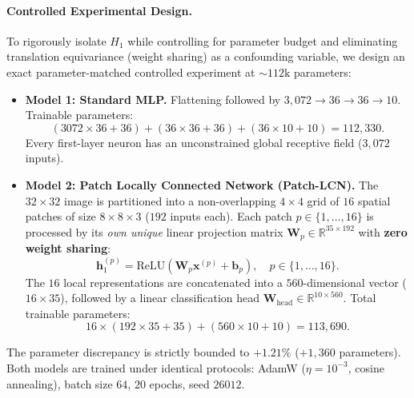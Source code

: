 \paragraph{Controlled Experimental Design.}
To rigorously isolate $H_1$ while controlling for parameter budget and eliminating translation equivariance (weight sharing) as a confounding variable, we design an exact parameter-matched controlled experiment at $\sim 112\text{k}$ parameters:
\begin{itemize}
    \item \textbf{Model 1: Standard MLP.} Flattening followed by $3{,}072 \to 36 \to 36 \to 10$. Trainable parameters:
    \begin{equation}
        (3072 \times 36 + 36) + (36 \times 36 + 36) + (36 \times 10 + 10) = 112{,}330.
    \end{equation}
    Every first-layer neuron has an unconstrained global receptive field ($3{,}072$ inputs).
    \item \textbf{Model 2: Patch Locally Connected Network (Patch-LCN).} The $32 \times 32$ image is partitioned into a non-overlapping $4 \times 4$ grid of $16$ spatial patches of size $8 \times 8 \times 3$ ($192$ inputs each). Each patch $p \in \{1, \dots, 16\}$ is processed by its \textit{own unique} linear projection matrix $\mathbf{W}_p \in \mathbb{R}^{35 \times 192}$ with \textbf{zero weight sharing}:
    \begin{equation}
        \mathbf{h}_1^{(p)} = \text{ReLU}(\mathbf{W}_p \mathbf{x}^{(p)} + \mathbf{b}_p), \quad p \in \{1, \dots, 16\}.
    \end{equation}
    The $16$ local representations are concatenated into a $560$-dimensional vector ($16 \times 35$), followed by a linear classification head $\mathbf{W}_{\text{head}} \in \mathbb{R}^{10 \times 560}$. Total trainable parameters:
    \begin{equation}
        16 \times (192 \times 35 + 35) + (560 \times 10 + 10) = 113{,}690.
    \end{equation}
\end{itemize}
The parameter discrepancy is strictly bounded to $+1.21\%$ ($+1{,}360$ parameters). Both models are trained under identical protocols: AdamW ($\eta=10^{-3}$, cosine annealing), batch size $64$, $20$ epochs, seed $26012$.

